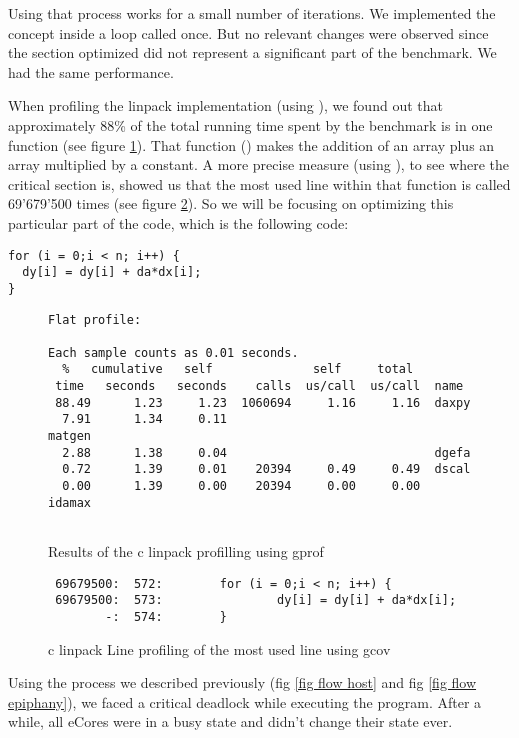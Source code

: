 Using that process works for a small number of iterations. We implemented the concept inside a loop called once. But no relevant changes were observed since the section optimized did not represent a significant part of the benchmark. We had the same performance.

When profiling the linpack implementation (using ), we found out that approximately 88\% of the total running time spent by the benchmark is in one function (see figure \ref{code profilling}). That function () makes the addition of an array plus an array multiplied by a constant. A more precise measure (using ), to see where the critical section is, showed us that the most used line within that function is called 69'679'500 times (see figure \ref{code profilling2}). So we will be focusing on optimizing this particular part of the code, which is the following code:

\begin{lstlisting}
for (i = 0;i < n; i++) {
  dy[i] = dy[i] + da*dx[i];
}
\end{lstlisting}

\begin{figure}[h!]
\begin{lstlisting}
Flat profile:

Each sample counts as 0.01 seconds.
  %   cumulative   self              self     total           
 time   seconds   seconds    calls  us/call  us/call  name    
 88.49      1.23     1.23  1060694     1.16     1.16  daxpy
  7.91      1.34     0.11                             matgen
  2.88      1.38     0.04                             dgefa
  0.72      1.39     0.01    20394     0.49     0.49  dscal
  0.00      1.39     0.00    20394     0.00     0.00  idamax
  
\end{lstlisting}
\caption{Results of the c linpack profilling using gprof}
\label{code profilling}
\end{figure}

\begin{figure}[h!]
\begin{lstlisting}
 69679500:  572:        for (i = 0;i < n; i++) {
 69679500:  573:                dy[i] = dy[i] + da*dx[i];
        -:  574:        }
\end{lstlisting}
\caption{c linpack Line profiling of the most used line using gcov}
\label{code profilling2}
\end{figure}

Using the process we described previously (fig \ref{fig flow host} and fig \ref{fig flow epiphany}), we faced a critical deadlock while executing the program. After a while, all \glspl{eCore} were in a busy state and didn't change their state ever. 

